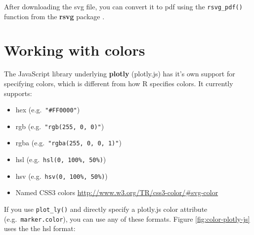 \documentclass[
  12pt,
]{krantz}
\newenvironment{Shaded}{\begin{snugshade}}{\end{snugshade}}
\newcommand{\DataTypeTok}[1]{\textcolor[rgb]{0.13,0.29,0.53}{#1}}
\newcommand{\DecValTok}[1]{\textcolor[rgb]{0.00,0.00,0.81}{#1}}
\newcommand{\KeywordTok}[1]{\textcolor[rgb]{0.13,0.29,0.53}{\textbf{#1}}}
\newcommand{\NormalTok}[1]{#1}
\newcommand{\OperatorTok}[1]{\textcolor[rgb]{0.81,0.36,0.00}{\textbf{#1}}}
\newcommand{\StringTok}[1]{\textcolor[rgb]{0.31,0.60,0.02}{#1}}
\providecommand{\tightlist}{%
  \setlength{\itemsep}{0pt}\setlength{\parskip}{0pt}}
\begin{document}
\begin{Shaded}
\end{Shaded}

After downloading the svg file, you can convert it to pdf using the \texttt{rsvg\_pdf()} function from the \textbf{rsvg} package \citep{rsvg}.

\hypertarget{working-with-colors}{%
\chapter{Working with colors}\label{working-with-colors}}

The JavaScript library underlying \textbf{plotly} (plotly.js) has it's own support for specifying colors, which is different from how R specifies colors. It currently supports:

\begin{itemize}
\tightlist
\item
  hex (e.g.~\texttt{"\#FF0000"})
\item
  rgb (e.g.~\texttt{"rgb(255,\ 0,\ 0)"})
\item
  rgba (e.g.~\texttt{"rgba(255,\ 0,\ 0,\ 1)"})
\item
  hsl (e.g.~\texttt{\textquotesingle{}hsl(0,\ 100\%,\ 50\%)\textquotesingle{}})
\item
  hsv (e.g.~\texttt{\textquotesingle{}hsv(0,\ 100\%,\ 50\%)\textquotesingle{}})
\item
  Named CSS3 colors \url{http://www.w3.org/TR/css3-color/\#svg-color}
\end{itemize}

If you use \texttt{plot\_ly()} and directly specify a plotly.js color attribute (e.g.~\texttt{marker.color}), you can use any of these formats. Figure \ref{fig:color-plotly-js} uses the the hsl format:

\begin{Shaded}
\end{Shaded}
\end{document}
